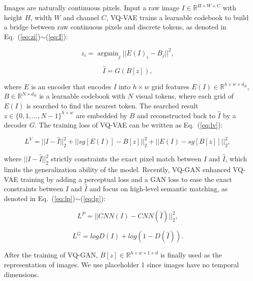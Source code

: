 Images are naturally continuous pixels. Input a raw image $I\in \mathbb{R}^{H\times W\times C}$ with height $H$, width $W$ and channel $C$,  VQ-VAE\cite{oordNeuralDiscreteRepresentation2017} trains a learnable codebook to build a bridge between raw continuous pixels and discrete tokens, as denoted in Eq.~(\ref{eq:zi})$\sim$(\ref{eq:I}):

\begin{equation} \label{eq:zi} 
z_i=\mathop{\arg\min}_{j}||E(I)_i-B_j||^2,
\end{equation}

\begin{equation} \label{eq:I} 
\hat{I}=G(B[z]),
\end{equation}

where $E$ is an encoder that encodes $I$ into $h\times w$ grid features $E(I)\in \mathbb{R}^{h\times w\times d_B}$, $B\in \mathbb{R}^{N\times d_B}$ is a learnable codebook with $N$ visual tokens, where each grid of $E(I)$ is searched to find the nearest token. The searched result $z\in \{0,1,…,N-1\}^{h\times w}$ are embedded by $B$ and reconstructed back to $\hat{I}$ by a decoder $G$. The training loss of VQ-VAE can be written as Eq.~(\ref{eq:lv}):

\begin{equation} \label{eq:lv} 
L^{V}=||I-\hat{I}||_2^2+||sg[E(I)]-B[z]||_2^2+||E(I)-sg[B[z]]||_2^2,
\end{equation}

where $||I-\hat{I}||_2^2$ strictly constraints the exact pixel match between $I$ and $\hat{I}$, which limits the generalization ability of the model. Recently, VQ-GAN\cite{esserTamingTransformersHighResolution2021} enhanced VQ-VAE training by adding a perceptual loss and a GAN loss to ease the exact constraints between $I$ and $\hat{I}$ and focus on high-level semantic matching, as denoted in Eq.~(\ref{eq:lp})$\sim$(\ref{eq:lg}):

\begin{equation} \label{eq:lp} 
L^{P}=||CNN(I)-CNN(\hat{I})||_2^2,
\end{equation}

\begin{equation} \label{eq:lg} 
L^{G}=logD(I)+log(1-D(\hat{I})).
\end{equation}

After the training of VQ-GAN, $B[z]\in \mathbb{R}^{h\times w\times 1\times d}$ is finally used as the representation of images. We use placeholder 1 since images have no temporal dimensions.

